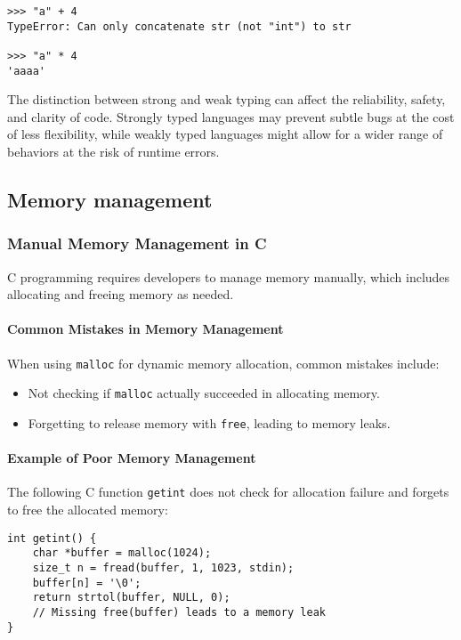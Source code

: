 \documentclass[12pt]{article}
\begin{document}
\begin{verbatim}
>>> "a" + 4
TypeError: Can only concatenate str (not "int") to str

>>> "a" * 4
'aaaa'
\end{verbatim}


The distinction between strong and weak typing can affect the reliability, safety, and clarity of code. Strongly typed languages may prevent subtle bugs at the cost of less flexibility, while weakly typed languages might allow for a wider range of behaviors at the risk of runtime errors.




\subsection{Memory management}
\subsubsection{Manual Memory Management in C}

C programming requires developers to manage memory manually, which includes allocating and freeing memory as needed.

\paragraph{Common Mistakes in Memory Management}

When using \texttt{malloc} for dynamic memory allocation, common mistakes include:

\begin{itemize}
    \item Not checking if \texttt{malloc} actually succeeded in allocating memory.
    \item Forgetting to release memory with \texttt{free}, leading to memory leaks.
\end{itemize}

\paragraph{Example of Poor Memory Management}
The following C function \texttt{getint} does not check for allocation failure and forgets to free the allocated memory:

\begin{verbatim}
int getint() {
    char *buffer = malloc(1024);
    size_t n = fread(buffer, 1, 1023, stdin);
    buffer[n] = '\0';
    return strtol(buffer, NULL, 0);
    // Missing free(buffer) leads to a memory leak
}
\end{verbatim}
\end{document}
